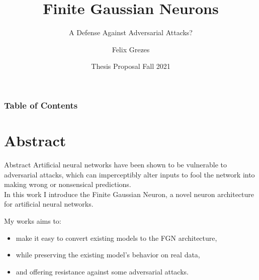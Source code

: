 \documentclass{beamer}
\title[FGNs vs Adversarial Attacks] %
{Finite Gaussian Neurons}
\subtitle{A Defense Against Adversarial Attacks?}
\author[Felix Grezes] %
{Felix Grezes}
\institute[CUNY GC] %
{
  \inst{}%
  Graduate Center\\
  City University of New York
}
\date[Thesis Proposal - Spring 2021] %
{Thesis Proposal Fall 2021}
\begin{document}
\frame{\titlepage}

\begin{frame}
    \frametitle{Table of Contents}
    \tableofcontents
\end{frame}


\section{Abstract}
\begin{frame}{Abstract}
Artificial neural networks have been shown to be vulnerable to adversarial attacks, which can imperceptibly alter inputs to fool the network into making wrong or nonsensical predictions.\\
\vspace{2mm}
In this work I introduce the Finite Gaussian Neuron, a novel neuron architecture for artificial neural networks.\\
\vspace{2mm}

My works aims to:
\begin{itemize}
    \item make it easy to convert existing models to the FGN architecture,
    \item while preserving the existing model's behavior on real data,
    \item and offering resistance against some adversarial attacks.
\end{itemize}

\end{frame}
\end{document}
